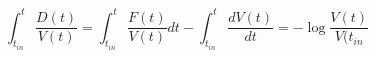 \begin{equation}
\int_{t_{in}}^t \frac{D(t)}{V(t)}=\int_{t_{in}}^t \frac{F(t)}{V(t)} dt - \int_{t_{in}}^t \frac{dV(t)}{dt} = -\log \frac{V(t)}{V(t_{in}}
\end{equation}